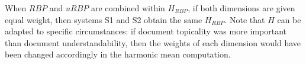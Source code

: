 When $RBP$ and $uRBP$ are combined within $H_{RBP}$, if both dimensions are given equal weight, then systems S1 and S2 obtain the same $H_{RBP}$. Note that $H$ can be adapted to specific circumstances: if document topicality was more important than document understandability, then the weights of each dimension would have been changed accordingly in the harmonic mean computation. 




%
%
%
%


 


